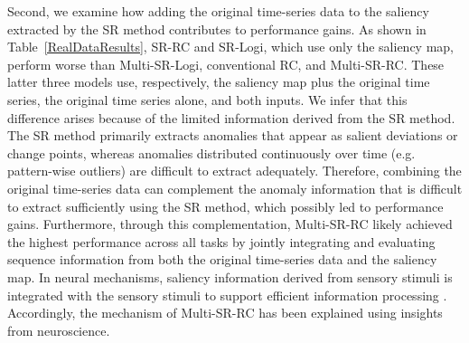 \documentclass[pdflatex,sn-nature]{sn-jnl}
\theoremstyle{thmstyleone}%
\theoremstyle{thmstyletwo}%
\theoremstyle{thmstylethree}%
\begin{document}
Second, we examine how adding the original time-series data to the saliency extracted by the SR method contributes to performance gains.
As shown in Table~\ref{RealDataResults}, SR-RC and SR-Logi, which use only the saliency map, perform worse than Multi-SR-Logi, conventional RC, and Multi-SR-RC. 
These latter three models use, respectively, the saliency map plus the original time series, the original time series alone, and both inputs.
We infer that this difference arises because of the limited information derived from the SR method.
The SR method primarily extracts anomalies that appear as salient deviations or change points, whereas anomalies distributed continuously over time (e.g. pattern-wise outliers) are difficult to extract adequately.
Therefore, combining the original time-series data can complement the anomaly information that is difficult to extract sufficiently using the SR method, which possibly led to performance gains.
Furthermore, through this complementation, Multi-SR-RC likely achieved the highest performance across all tasks by jointly integrating and evaluating sequence information from both the original time-series data and the saliency map.
In neural mechanisms, saliency information derived from sensory stimuli is integrated with the sensory stimuli to support efficient information processing \cite{chica2013two,bisley2019neural,moore2003selective,zhou2011feature}.
Accordingly, the mechanism of Multi-SR-RC has been explained using insights from neuroscience.
\end{document}
